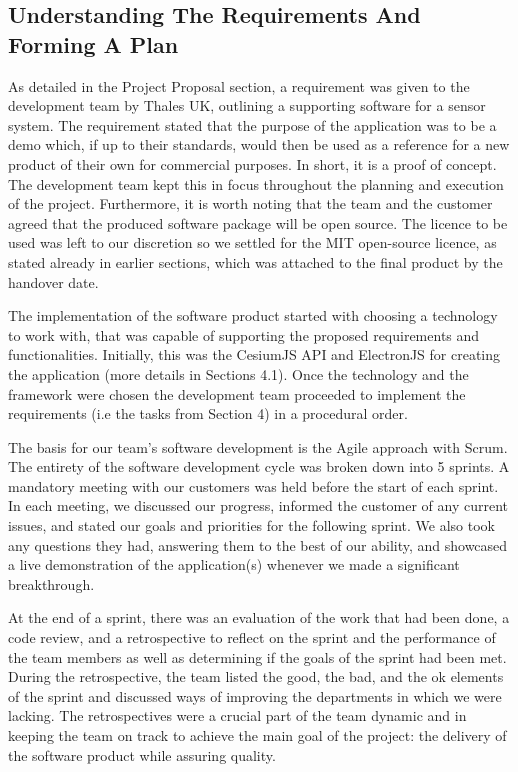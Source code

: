 \documentclass{l3proj}
\begin{document}
\subsection{Understanding The Requirements And Forming A Plan}

As detailed in the Project Proposal section, a requirement was given to the development team by Thales UK, outlining a supporting software for a sensor system. The requirement stated that the purpose of the application was to be a demo which, if up to their standards, would then be used as a reference for a new product of their own for commercial purposes. In short, it is a proof of concept. The development team kept this in focus throughout the planning and execution of the project. Furthermore, it is worth noting that the team and the customer agreed that the produced software package will be open source. The licence to be used was left to our discretion so we settled for the MIT open-source licence\cite{mit}, as stated already in earlier sections, which was attached to the final product by the handover date. 
  
The implementation of the software product started with choosing a technology to work with, that was capable of supporting the proposed requirements and functionalities. Initially, this was the CesiumJS API and ElectronJS for creating the application (more details in Sections 4.1). Once the technology and the framework were chosen the development team proceeded to implement the requirements (i.e the tasks from Section 4) in a procedural order.

The basis for our team’s software development is the Agile\cite{agile} approach with Scrum\cite{scrum}. The entirety of the software development cycle was broken down into 5 sprints. A mandatory meeting with our customers was held before the start of each sprint. In each meeting, we discussed our progress, informed the customer of any current issues, and stated our goals and priorities for the following sprint. We also took any questions they had, answering them to the best of our ability, and showcased a live demonstration of the application(s) whenever we made a significant breakthrough.
 
At the end of a sprint, there was an evaluation of the work that had been done, a code review\cite{coder}, and a retrospective\cite{retro} to reflect on the sprint and the performance of the team members as well as determining if the goals of the sprint had been met. During the retrospective, the team listed the good, the bad, and the ok elements of the sprint and discussed ways of improving the departments in which we were lacking. The retrospectives were a crucial part of the team dynamic and in keeping the team on track to achieve the main goal of the project: the delivery of the software product while assuring quality.
\end{document}
